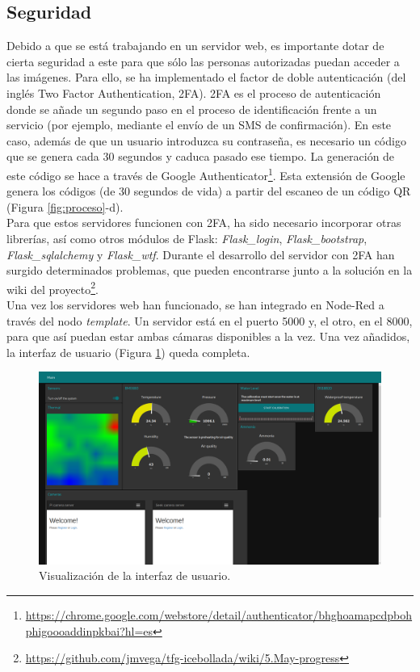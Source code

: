 \subsection{Seguridad}
Debido a que se está trabajando en un servidor web, es importante dotar de cierta seguridad a este para que sólo las personas autorizadas puedan acceder a las imágenes. Para ello, se ha implementado el factor de doble autenticación (del inglés Two Factor Authentication, 2FA). 2FA es el proceso de autenticación donde se añade un segundo paso en el proceso de identificación frente a un servicio (por ejemplo, mediante el envío de un SMS de confirmación). En este caso, además de que un usuario introduzca su contraseña, es necesario un código que se genera cada 30 segundos y caduca pasado ese tiempo. La generación de este código se hace a través de Google Authenticator\footnote{\url{https://chrome.google.com/webstore/detail/authenticator/bhghoamapcdpbohphigoooaddinpkbai?hl=es}}. Esta extensión de Google genera los códigos (de 30 segundos de vida) a partir del escaneo de un código QR (Figura \ref{fig:proceso}-d).\\

Para que estos servidores funcionen con 2FA, ha sido necesario incorporar otras librerías, así como otros módulos de Flask: \textit{Flask\_login}, \textit{Flask\_bootstrap}, \textit{Flask\_sqlalchemy} y \textit{Flask\_wtf}. Durante el desarrollo del servidor con 2FA han surgido determinados problemas, que pueden encontrarse junto a la solución en la wiki del proyecto\footnote{\url{https://github.com/jmvega/tfg-icebollada/wiki/5.May-progress}}.\\

Una vez los servidores web han funcionado, se han integrado en Node-Red a través del nodo \textit{template}. Un servidor está en el puerto 5000 y, el otro, en el 8000, para que así puedan estar ambas cámaras disponibles a la vez. Una vez añadidos, la interfaz de usuario (Figura \ref{fig:UIcompleta}) queda completa.\\
\begin{figure} [h!]
  \begin{center}
    \includegraphics[width=16cm]{figs/UIcompleta}
  \end{center}
  \caption{Visualización de la interfaz de usuario.}
  \label{fig:UIcompleta}
\end{figure}


